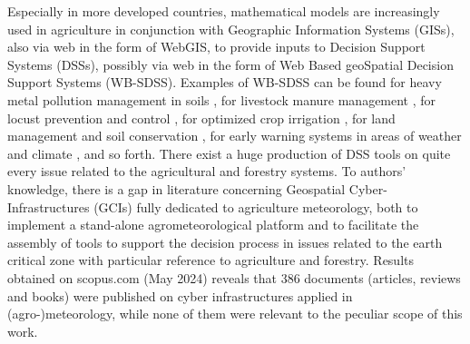 \documentclass[authoryear,preprint,review,12pt]{elsarticle}
\newcommand{\note}[1]{\emph{\textcolor{red}{#1}}}
\newcommand{\review}[1]{\emph{\textcolor{cyan}{#1}}}
\begin{document}
Especially in more developed countries, mathematical models are increasingly used in agriculture in conjunction with Geographic Information Systems (GISs), also via web in the form of WebGIS, to provide inputs to Decision Support Systems (DSSs), possibly via web in the form of Web Based geoSpatial Decision Support Systems (WB-SDSS).
Examples of WB-SDSS can be found 
for heavy metal pollution management in soils \citep{Wang:wbsdss:2005}, 
for livestock manure management \citep{Acutis:wbsdss:2014}, 
for locust prevention and control \citep{Yao:wbsdss:2017}, 
for optimized crop irrigation \citep{Giusti:wbsdss:2015}, 
for land management and soil conservation \citep{Terribile:LandSupport:2024}, 
for early warning systems in areas of weather and climate \citep{Bopape_2019},
and so forth.
There exist a huge production of DSS tools on quite every issue related to the agricultural and forestry systems.
To authors' knowledge, there is a gap in literature concerning Geospatial Cyber-Infrastructures (GCIs) fully dedicated to agriculture meteorology, both to implement a stand-alone agrometeorological platform and to facilitate the assembly of tools to support the decision process in issues related to the earth critical zone with particular reference to agriculture and forestry. 
Results obtained on scopus.com (May 2024) reveals that 386 documents (articles, reviews and books) were published on cyber infrastructures applied in (agro-)meteorology, while none of them were relevant to the peculiar scope of this work.
\end{document}
